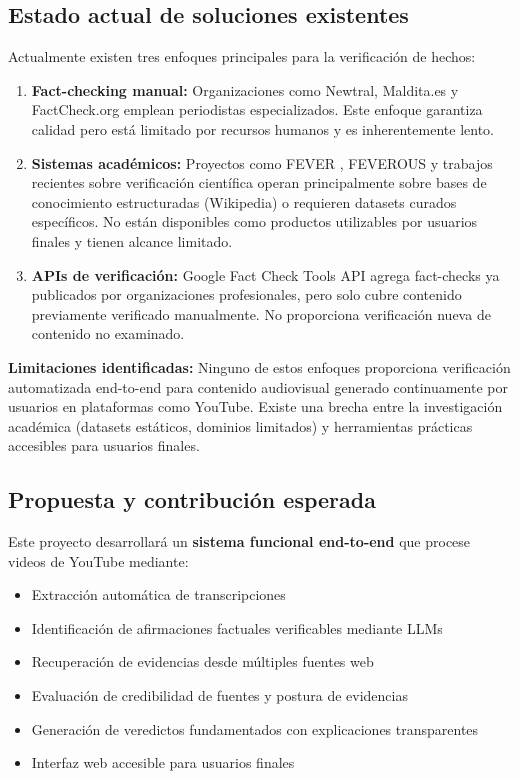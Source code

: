 \documentclass[12pt,a4paper]{article}
\begin{document}
\subsection{Estado actual de soluciones existentes}

Actualmente existen tres enfoques principales para la verificación de hechos:

\begin{enumerate}
    \item \textbf{Fact-checking manual:} Organizaciones como Newtral, Maldita.es y FactCheck.org emplean periodistas especializados. Este enfoque garantiza calidad pero está limitado por recursos humanos y es inherentemente lento.

    \item \textbf{Sistemas académicos:} Proyectos como FEVER \citep{thorne2018fever}, FEVEROUS \citep{aly2021feverous} y trabajos recientes sobre verificación científica \citep{wadden2020scifact} operan principalmente sobre bases de conocimiento estructuradas (Wikipedia) o requieren datasets curados específicos. No están disponibles como productos utilizables por usuarios finales y tienen alcance limitado.

    \item \textbf{APIs de verificación:} Google Fact Check Tools API agrega fact-checks ya publicados por organizaciones profesionales, pero solo cubre contenido previamente verificado manualmente. No proporciona verificación nueva de contenido no examinado.
\end{enumerate}

\textbf{Limitaciones identificadas:} Ninguno de estos enfoques proporciona verificación automatizada end-to-end para contenido audiovisual generado continuamente por usuarios en plataformas como YouTube. Existe una brecha entre la investigación académica (datasets estáticos, dominios limitados) y herramientas prácticas accesibles para usuarios finales.

\subsection{Propuesta y contribución esperada}

Este proyecto desarrollará un \textbf{sistema funcional end-to-end} que procese videos de YouTube mediante:

\begin{itemize}
    \item Extracción automática de transcripciones
    \item Identificación de afirmaciones factuales verificables mediante LLMs
    \item Recuperación de evidencias desde múltiples fuentes web
    \item Evaluación de credibilidad de fuentes y postura de evidencias
    \item Generación de veredictos fundamentados con explicaciones transparentes
    \item Interfaz web accesible para usuarios finales
\end{itemize}
\end{document}
